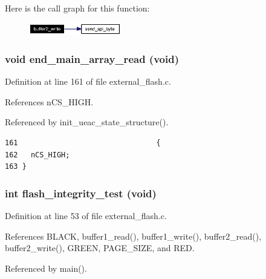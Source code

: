 Here is the call graph for this function:\begin{figure}[H]
\begin{center}
\leavevmode
\includegraphics[width=114pt]{external__flash_8c_a8_cgraph}
\end{center}
\end{figure}
\subsubsection{\setlength{\rightskip}{0pt plus 5cm}void end\_\-main\_\-array\_\-read (void)}\label{external__flash_8c_a2}




Definition at line 161 of file external\_\-flash.c.

References n\-CS\_\-HIGH.

Referenced by init\_\-ueac\_\-state\_\-structure().

\footnotesize\begin{verbatim}161                                {
162   nCS_HIGH;
163 }
\end{verbatim}\normalsize 


\subsubsection{\setlength{\rightskip}{0pt plus 5cm}int flash\_\-integrity\_\-test (void)}\label{external__flash_8c_a0}




Definition at line 53 of file external\_\-flash.c.

References BLACK, buffer1\_\-read(), buffer1\_\-write(), buffer2\_\-read(), buffer2\_\-write(), GREEN, PAGE\_\-SIZE, and RED.

Referenced by main().

